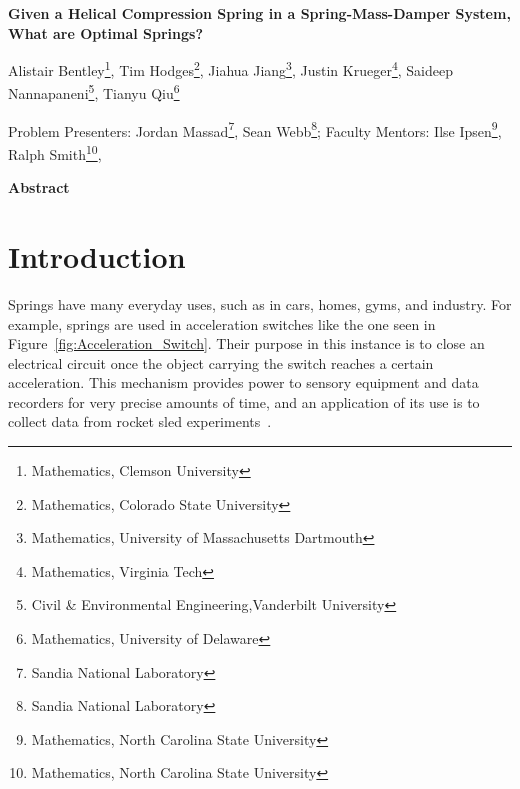 \documentclass[10pt]{article}
\begin{document}
\centerline{\large \bf Given a Helical Compression Spring in a Spring-Mass-Damper System, What are Optimal Springs?}

\vspace{.1truein}

\def\thefootnote{\arabic{footnote}}
\begin{center}
  
  Alistair Bentley\footnote{Mathematics, Clemson University},
   Tim Hodges\footnote{Mathematics, Colorado State University},
   Jiahua Jiang\footnote{Mathematics, University of Massachusetts Dartmouth },
  Justin Krueger\footnote{Mathematics, Virginia Tech},
  Saideep Nannapaneni\footnote{Civil \& Environmental Engineering,Vanderbilt University},
  Tianyu Qiu\footnote{Mathematics, University of Delaware}
   
\end{center}



\begin{center}
Problem Presenters: Jordan Massad\footnote{Sandia National Laboratory},
Sean Webb\footnote{Sandia National Laboratory};
	Faculty Mentors: Ilse Ipsen\footnote{Mathematics, North Carolina State University},
	Ralph Smith\footnote{Mathematics, North Carolina State University}, 
\end{center}


\vspace{.3truein}
\centerline{\bf Abstract}


\section{Introduction}
\label{sec:Introduction}

Springs have many everyday uses, such as in cars, homes, gyms, and industry. For example, springs are used in acceleration switches like the one seen in Figure~\ref{fig:Acceleration_Switch}. Their purpose in this instance is to close an electrical circuit once the object carrying the switch reaches a certain acceleration. This mechanism provides power to sensory equipment and data recorders for very precise amounts of time, and an application of its use is to collect data from rocket sled experiments~\cite{Massad2015}. 
\end{document}
